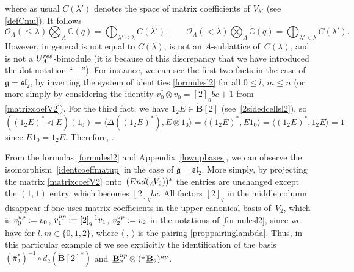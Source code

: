 \documentclass[11pt]{article}
\numberwithin{equation}{section}
\numberwithin{equation}{section}
\theoremstyle{definition}
\newcommand{\Oo}{{\mathcal O}}
\newcommand{\smallbullet}{%
\vcenter{\hbox{\,\scalebox{0.5}{$\bullet$}\,}}
}
\begin{document}
where as usual $C(\lambda')$ denotes the space of matrix coefficients of $V_{\lambda'}$ (see \eqref{defCmu}). It follows
\begin{equation}\label{tensorCOA}
\Oo_A(\leq \lambda) \bigotimes_A {\mathbb C}(q)=\bigoplus_{\lambda'\leq \lambda}C(\lambda'), \qquad\Oo_A(<\lambda) \bigotimes_A {\mathbb C}(q)=\bigoplus_{\lambda'< \lambda}C(\lambda').
\end{equation}
However, in general \smash{${}_A \overset{\raisebox{-1.5pt}{\scriptsize$\smallbullet$}}{C} (\lambda)\bigotimes_A {\mathbb C}(q)$} is not equal to $C(\lambda)$, \smash{${}_A \overset{\raisebox{-1.5pt}{\scriptsize$\smallbullet$}}{C} (\lambda)$} is not an $A$-sublattice of~$C(\lambda)$, and \smash{${}_A \overset{\raisebox{-1.5pt}{\scriptsize$\smallbullet$}}{C} (\lambda)$} is not a $U_A^{\rm res}$-bimodule (it is because of this discrepancy that we have introduced the dot notation ``\ \smash{${}^{\smallbullet}$}\ ''). For instance, we can see the first two facts in the case of $\mathfrak{g} = {\mathfrak{sl}_2}$, by inverting the system of identities \eqref{formulesl2} for all $0\leq l$, $m\leq n$ (or more simply by considering the identity $v_0^* \otimes v_0=[2]_qbc +1$ from \eqref{matrixcoefV2}). For the third fact, we have ${1_2 E\in \dot{\mathbf{B}} [2]}$ (see~\eqref{2sidedcellsl2}), so~${((1_2 E)^* \lhd E)(1_0) \!=\!\langle \Delta((1_2 E)^* ), E\otimes 1_0\rangle\!= \! \langle(1_2 E)^* , E1_0\rangle\!=\!\langle(1_2 E)^*, 1_2E\rangle\!=\!1}$ since $E1_0\! =\! 1_2E$. Therefore, \smash{$(1_2 E)^* \lhd E \notin {}_A \overset{\raisebox{-1.5pt}{\scriptsize$\smallbullet$}}{C} (2)$}.

From the formulas \eqref{formulesl2} and Appendix~\ref{lowupbases}, we can observe the isomorphism~\eqref{identcoeffmatup} in the case of $\mathfrak{g} = {\mathfrak{sl}_2}$. More simply, by projecting the matrix \eqref{matrixcoefV2} onto~$({\rm End}({}_A \!V_2))^*$ the entries are unchanged except the $(1,1)$ entry, which becomes $[2]_q bc$. All factors $[2]_q$ in the middle column disappear if one uses matrix coefficients in the upper canonical basis of~$V_2$, which is $v_0^{\rm up}:=v_0$, $v_1^{\rm up}:=[2]_q^{-1}v_1$, $v_2^{\rm up}:=v_2$ in the notations of \eqref{formulesl2}, since we have
 for $l,m\in \{0,1,2\}$, where $\langle\ ,\ \rangle$ is the pairing \eqref{proppairinglambda}. Thus, in this particular example of  we see explicitly the identification of the basis $(\bar{\pi}_2^*)^{-1} \circ d_2(\dot{\mathbf{B}} [2]^*)$ and~${\underline{\mathbf{B}}_2^{\rm up} \otimes ({}^{\omega}\underline{\mathbf{B}}_2)^{\rm up}}$.
\end{document}
